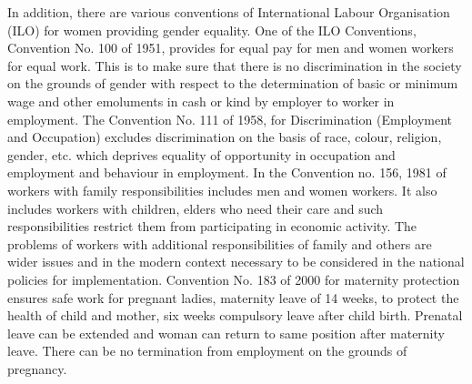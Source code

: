 \begin{multicols}{2}
\vspace{-.15cm}

\noi
In addition, there are various conventions of International Labour Organisation (ILO) for
women providing gender equality. One of the ILO Conventions, Convention No. 100 of
1951, provides for equal pay for men and women workers for equal work. This is to make
sure that there is no discrimination in the society on the grounds of gender with respect to the
determination of basic or minimum wage and other emoluments in cash or kind by employer
to worker in employment. The Convention No. 111 of 1958, for Discrimination (Employment
and Occupation) excludes discrimination on the basis of race, colour, religion, gender, etc.
which deprives equality of opportunity in occupation and employment and behaviour in
employment. In the Convention no. 156, 1981 of workers with family responsibilities
includes men and women workers. It also includes workers with children, elders who need
their care and such responsibilities restrict them from participating in economic activity. The
problems of workers with additional responsibilities of family and others are wider issues and
in the modern context necessary to be considered in the national policies for implementation.
Convention No. 183 of 2000 for maternity protection ensures safe work for pregnant ladies,
maternity leave of 14 weeks, to protect the health of child and mother, six weeks compulsory
leave after child birth. Prenatal leave can be extended and woman can return to same position
after maternity leave. There can be no termination from employment on the grounds of
pregnancy.

\vspace{-.15cm}


\end{multicols}
